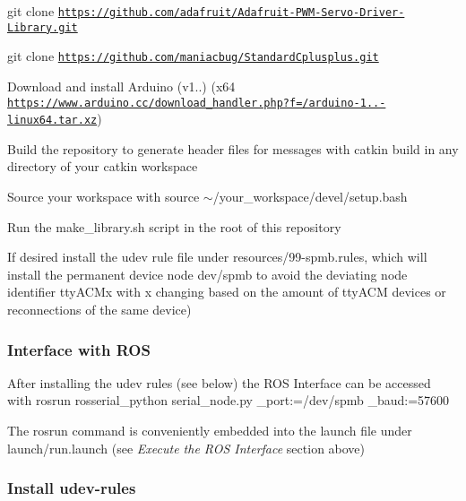 \begin{DoxyItemize}
\item {\ttfamily git clone \href{https://github.com/adafruit/Adafruit-PWM-Servo-Driver-Library.git}{\tt https\+://github.\+com/adafruit/\+Adafruit-\/\+P\+W\+M-\/\+Servo-\/\+Driver-\/\+Library.\+git}}
\item {\ttfamily git clone \href{https://github.com/maniacbug/StandardCplusplus.git}{\tt https\+://github.\+com/maniacbug/\+Standard\+Cplusplus.\+git}}
\item Download and install Arduino (v1..) (x64 \href{https://www.arduino.cc/download_handler.php?f=/arduino-1.8.5-linux64.tar.xz}{\tt https\+://www.\+arduino.\+cc/download\+\_\+handler.\+php?f=/arduino-\/1..-\/linux64.\+tar.\+xz})
\item Build the repository to generate header files for messages with {\ttfamily catkin build} in any directory of your catkin workspace
\item Source your workspace with {\ttfamily source $\sim$/your\+\_\+workspace/devel/setup.bash}
\item Run the {\ttfamily make\+\_\+library.\+sh} script in the root of this repository
\item If desired install the udev rule file under {\ttfamily resources/99-\/spmb.\+rules}, which will install the permanent device node {\ttfamily dev/spmb} to avoid the deviating node identifier tty\+A\+C\+Mx with x changing based on the amount of tty\+A\+CM devices or reconnections of the same device)
\end{DoxyItemize}

\subsubsection*{Interface with R\+OS}


\begin{DoxyItemize}
\item After installing the udev rules (see below) the R\+OS Interface can be accessed with {\ttfamily rosrun rosserial\+\_\+python serial\+\_\+node.\+py \+\_\+port\+:=/dev/spmb \+\_\+baud\+:=57600}
\item The {\ttfamily rosrun} command is conveniently embedded into the launch file under {\ttfamily launch/run.\+launch} (see {\itshape Execute the R\+OS Interface} section above)
\end{DoxyItemize}

\subsubsection*{Install udev-\/rules}


